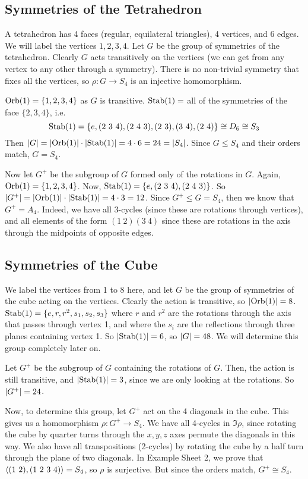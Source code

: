 \subsection{Symmetries of the Tetrahedron}
A tetrahedron has 4 faces (regular, equilateral triangles), 4 vertices, and 6 edges. We will label the vertices \(1, 2, 3, 4\). Let \(G\) be the group of symmetries of the tetrahedron. Clearly \(G\) acts transitively on the vertices (we can get from any vertex to any other through a symmetry). There is no non-trivial symmetry that fixes all the vertices, so \(\rho\colon G \to S_4\) is an injective homomorphism.

\(\operatorname{Orb}(1) = \{ 1, 2, 3, 4 \}\) as \(G\) is transitive. \(\operatorname{Stab}(1) =\) all of the symmetries of the face \(\{2,3,4\}\), i.e.
\[ \operatorname{Stab}(1) = \{ e, (2\ 3\ 4), (2\ 4\ 3), (2\ 3), (3\ 4), (2\ 4) \} \cong D_6 \cong S_3 \]
Then \(\abs{G} = \abs{\operatorname{Orb}(1)} \cdot \abs{\operatorname{Stab}(1)} = 4 \cdot 6 = 24 = \abs{S_4}\). Since \(G \leq S_4\) and their orders match, \(G = S_4\).

Now let \(G^+\) be the subgroup of \(G\) formed only of the rotations in \(G\). Again, \(\operatorname{Orb}(1) = \{ 1, 2, 3, 4 \}\). Now, \(\operatorname{Stab}(1) = \{ e, (2\ 3\ 4), (2\ 4\ 3) \}\). So \(\abs{G^+} = \abs{\operatorname{Orb}(1)} \cdot \abs{\operatorname{Stab}(1)} = 4 \cdot 3 = 12\). Since \(G^+ \leq G = S_4\), then we know that \(G^+ = A_4\). Indeed, we have all 3-cycles (since these are rotations through vertices), and all elements of the form \((1\ 2)(3\ 4)\) since these are rotations in the axis through the midpoints of opposite edges.

\subsection{Symmetries of the Cube}
We label the vertices from 1 to 8 here, and let \(G\) be the group of symmetries of the cube acting on the vertices. Clearly the action is transitive, so \(\abs{\operatorname{Orb}(1)} = 8\). \(\operatorname{Stab}(1) = \{ e, r, r^2, s_1, s_2, s_3 \}\) where \(r\) and \(r^2\) are the rotations through the axis that passes through vertex 1, and where the \(s_i\) are the reflections through three planes containing vertex 1. So \(\abs{\operatorname{Stab}(1)} = 6\), so \(\abs{G} = 48\). We will determine this group completely later on.

Let \(G^+\) be the subgroup of \(G\) containing the rotations of \(G\). Then, the action is still transitive, and \(\abs{\operatorname{Stab}(1)} = 3\), since we are only looking at the rotations. So \(\abs{G^+} = 24\).

Now, to determine this group, let \(G^+\) act on the 4 diagonals in the cube. This gives us a homomorphism \(\rho\colon G^+ \to S_4\). We have all 4-cycles in \(\Im \rho\), since rotating the cube by quarter turns through the \(x, y, z\) axes permute the diagonals in this way. We also have all transpositions (2-cycles) by rotating the cube by a half turn through the plane of two diagonals. In Example Sheet 2, we prove that \(\langle{} (1\ 2), (1\ 2\ 3\ 4) \rangle = S_4\), so \(\rho\) is surjective. But since the orders match, \(G^+ \cong S_4\).

